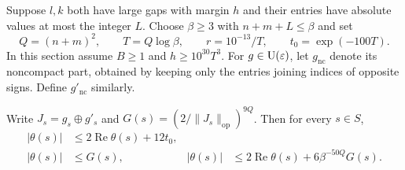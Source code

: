 Suppose $l,k$ both have large gaps with margin $h$ and their entries have absolute values at most the integer $L$. Choose $\beta\ge 3$ with $n+m+L\le\beta$ and set
\[
Q=(n+m)^2,\qquad T=Q\log\beta,\qquad
r=10^{-13}/T,\qquad t_0=\exp(-100T).
\]
In this section assume $B\ge1$ and $h\ge10^{30}T^3$. For $g\in \operatorname{U}(\varepsilon)$, let $g_{\mathrm{nc}}$ denote its noncompact part, obtained by keeping only the entries joining indices of opposite signs. Define $g'_{\mathrm{nc}}$ similarly.

\begin{lemma}
\label{lem:ch8-pointwise}
Write $J_s=g_s\oplus g'_s$ and $G(s)=(2/\|J_s\|_{\mathrm{op}})^{9Q}$. Then for every $s\in S$,
\begin{align}
|\theta(s)|&\le 2\operatorname{Re}\theta(s)+12t_0,
\label{eq:ch8-cone-bound}\\
|\theta(s)|&\le G(s),&
|\theta(s)|&\le 2\operatorname{Re}\theta(s)+6\beta^{-50Q}G(s).
\label{eq:ch8-decay}
\end{align}
\end{lemma}
